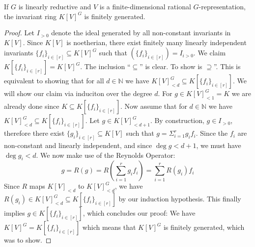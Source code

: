 
\begin{theorem}\label{hilbert}
  If $G$ is linearly reductive and $V$ is a finite-dimensional rational $G$-representation, the invariant ring $K[V]^G$ is finitely generated.
\end{theorem}

\begin{proof}
  Let $I_{>0}$ denote the ideal generated by all non-constant invariants in $K[V]$.
  Since $K[V]$ is noetherian, there exist finitely many linearly independent invariants $\{f_i\}_{i \in [r]} \subseteq K[V]^G$ such that $ \left( \{f_i\}_{i \in [r]} \right) = I_{i>0} $.
  We claim $K[\{f_i\}_{i \in [r]}] = K[V]^G$.
  The inclusion ``$\subseteq$'' is clear.
  To show is $\supseteq$''.
  This is equivalent to showing that for all $d \in \mathbb{N}$ we have $K[V]^G_{<d} \subseteq K[\{f_i\}_{i \in [r]}] $.
  We will show our claim via induciton over the degree $d$.
  For $g \in K[V]^G_{<1} = K$ we are already done since $K \subseteq K[\{f_i\}_{i \in [r]}]$.
  Now assume that for $d \in \mathbb{N}$ we have $K[V]^G_{<d} \subseteq K[\{f_i\}_{i \in [r]}]$.
  Let $g \in K[V]^G_{< d+1}$.
  By construction, $g \in I_{>0}$, therefore there exist $\{g_i\}_{i \in [r]} \subseteq K[V]$ such that $g = \Sigma_{i=1}^r g_i f_i$.
  Since the $f_i$ are non-constant and linearly independent, and since $\operatorname{deg} g < d+1$, we must have $ \operatorname{deg} g_i < d $.
  We now make use of the Reynolds Operator:
  \begin{equation}
      g = R(g)
      =  R \left( \sum_{i=1}^r g_i f_i \right)
      = \sum_{i=1}^r R( g_i) f_i
  \end{equation}
  Since $R$ maps $K[V]_{<d}$ to $K[V]^G_{<d}$, we have $R(g_i) \in K[V]^G_{<d} \subseteq K[\{f_i\}_{i \in [r]}]$ by our induction hypothesis.
  This finally implies $ g \in K[\{f_i\}_{i \in [r]}]$, which concludes our proof:
  We have $K[V]^G = K[\{f_i\}_{i \in [r]}]$ which means that $K[V]^G$ is finitely generated, which was to show.
\end{proof}

